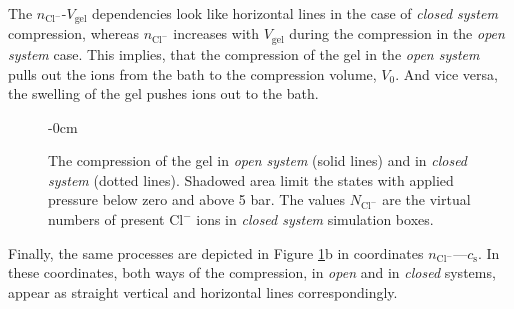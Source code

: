 \documentclass[gels,article,accept,pdftex,moreauthors]{Definitions/mdpi}
\newcommand{\ncl}{n_\mathrm{Cl^-}}
\newcommand{\cl}{\mathrm{Cl^-}}
\newcommand{\cs}{c_{\mathrm{s}}}
\newcommand{\Vgel}{V_\mathrm{gel}}
\newcommand{\Vbox}{V_0}
\begin{document}
The $\ncl$-$\Vgel$ dependencies look like horizontal lines in the case of \emph{closed system} compression,
whereas $\ncl$ increases with $\Vgel$ during the compression in the \emph{open system} case. 
This implies, that the compression of the gel in the \emph{open system} pulls out the ions from the bath to the compression volume, $\Vbox$. 
And vice versa, the swelling of the gel pushes ions out to the bath.
\begin{figure}[H]
\begin{adjustwidth}{-\extralength}{0cm}
{\captionsetup{position=bottom,justification=centering}
\hspace{0.02\textwidth}
}\end{adjustwidth}
\caption{The compression of the gel in \emph{open system} (solid lines) and in \emph{closed system} (dotted lines). 
Shadowed area limit the states with applied pressure below zero and above 5 bar.
The values $N_\cl$ are the virtual numbers of present $\cl$ ions in \emph{closed system} simulation boxes.
\label{fig: NV and CN}}

\end{figure}
Finally, the same processes are depicted in Figure \ref{fig: NV and CN}b in coordinates $\ncl$---$\cs$. 
In these coordinates, both ways of the compression, in \emph{open} and in \emph{closed} systems, appear as straight vertical and horizontal lines correspondingly. 
\end{document}
